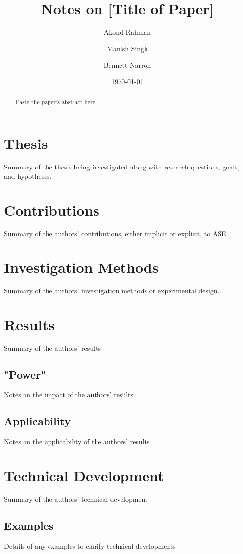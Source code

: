 \documentclass[12pt]{article}
\title{Notes on [Title of Paper] \cite{author:year}}
\author{
        Akond Rahman
            \and
        Manish Singh
        	\and
        Bennett Narron
}
\date{\today}
\begin{document}
\maketitle

\begin{abstract}
Paste the paper's abstract here.
\end{abstract}

\section{Thesis}\label{thesis}
Summary of the thesis being investigated along with research questions, goals, and hypotheses.

\section{Contributions}\label{contrib}
Summary of the authors' contributions, either implicit or explicit, to ASE

\section{Investigation Methods}\label{invest}
Summary of the authors' investigation methods or experimental design.

\section{Results}\label{results}
Summary of the authors' results

\subsection{"Power"}\label{results-power}
Notes on the impact of the authors' results

\subsection{Applicability}\label{results-apply}
Notes on the applicability of the authors' results

\section{Technical Development}\label{tech}
Summary of the authors' technical development

\subsection{Examples}\label{tech-examples}
Details of any examples to clarify technical developments



\end{document}
